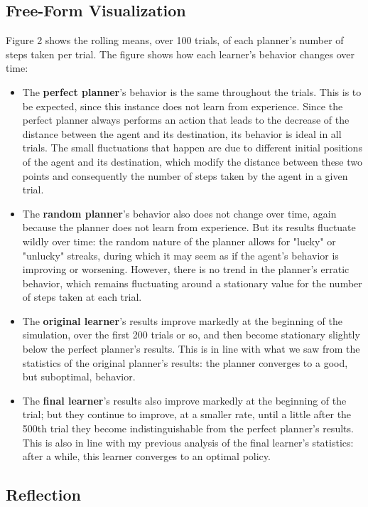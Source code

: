 \documentclass{article}
\begin{document}
\subsection{Free-Form Visualization}
Figure 2 shows the rolling means, over 100 trials, of each planner's number of steps taken per trial. The figure shows how each learner's behavior changes over time:

\begin{itemize}
    \item The \textbf{perfect planner}'s behavior is the same throughout the trials. This is to be expected, since this instance does not learn from experience. Since the perfect planner always performs an action that leads to the decrease of the distance between the agent and its destination, its behavior is ideal in all trials. The small fluctuations that happen are due to different initial positions of the agent and its destination, which modify the distance between these two points and consequently the number of steps taken by the agent in a given trial.
    \item The \textbf{random planner}'s behavior also does not change over time, again because the planner does not learn from experience. But its results fluctuate wildly over time: the random nature of the planner allows for "lucky" or "unlucky" streaks, during which it may seem as if the agent's behavior is improving or worsening. However, there is no trend in the planner's erratic behavior, which remains fluctuating around a stationary value for the number of steps taken at each trial.
    \item The \textbf{original learner}'s results improve markedly at the beginning of the simulation, over the first 200 trials or so, and then become stationary slightly below the perfect planner's results. This is in line with what we saw from the statistics of the original planner's results: the planner converges to a good, but suboptimal, behavior.
    \item The \textbf{final learner}'s results also improve markedly at the beginning of the trial; but they continue to improve, at a smaller rate, until a little after the 500th trial they become indistinguishable from the perfect planner's results. This is also in line with my previous analysis of the final learner's statistics: after a while, this learner converges to an optimal policy. 
\end{itemize}

\subsection{Reflection}
\end{document}
